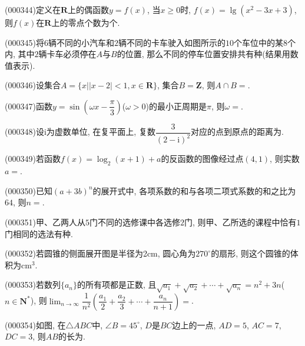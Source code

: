 \item (000344)定义在$\mathbf{R}$上的偶函数$y=f(x)$, 当$x\ge 0$时, $f(x)=\lg (x^2-3x+3)$, 则$f(x)$在$\mathbf{R}$上的零点个数为个.
\item (000345)将$6$辆不同的小汽车和$2$辆不同的卡车驶入如图所示的$10$个车位中的某$8$个内, 其中$2$辆卡车必须停在$A$与$B$的位置, 那么不同的停车位置安排共有种(结果用数值表示).
\begin{center}
\end{center}
\item (000346)设集合$A=\{x||x-2|<1,x\in \mathbf{R}\}$, 集合$B=\mathbf{Z}$, 则$A\cap B=$.
\item (000347)函数$y=\sin (\omega x-\dfrac{\pi}{3})$($\omega >0$)的最小正周期是$\pi$, 则$\omega =$.
\item (000348)设$\mathrm{i}$为虚数单位, 在复平面上, 复数$\dfrac{3}{(2-\mathrm{i})^2}$对应的点到原点的距离为.
\item (000349)若函数$f(x)=\log_2 (x+1)+a$的反函数的图像经过点$(4,1)$, 则实数$a=$.
\item (000350)已知$(a+3b)^n$的展开式中, 各项系数的和与各项二项式系数的和之比为$64$, 则$n=$.
\item (000351)甲、乙两人从$5$门不同的选修课中各选修$2$门, 则甲、乙所选的课程中恰有$1$门相同的选法有种.
\item (000352)若圆锥的侧面展开图是半径为2$\text{cm}$, 圆心角为$270^\circ$的扇形, 则这个圆锥的体积为$\text{cm}^3$.
\item (000353)若数列$\{a_n\}$的所有项都是正数, 且$\sqrt{a_1}+\sqrt{a_2}+\cdots +\sqrt{a_n}=n^2+3n$($n\in \mathbf{N}^*$), 则$\displaystyle\lim_{n\to\infty}\dfrac{1}{n^2}(\dfrac{a_1}{2}+\dfrac{a_2}{3}+\cdots +\dfrac{a_n}{n+1})=$.
\item (000354)如图, 在$\triangle ABC$中, $\angle B=45^\circ$, $D$是$BC$边上的一点, $AD=5$, $AC=7$, $DC=3$, 则$AB$的长为.
\begin{center}
\end{center}
